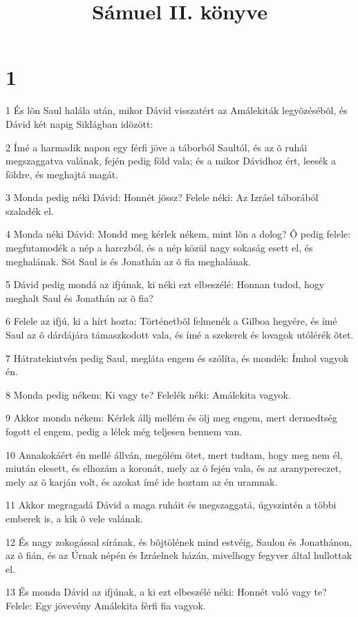 

\title{Sámuel II. könyve}


\chapter{1}

\par 1 És lõn Saul halála után, mikor Dávid visszatért az Amálekiták legyõzésébõl, és Dávid két napig Siklágban idõzött:
\par 2 Ímé a harmadik napon egy férfi jöve a táborból Saultól, és az õ ruhái megszaggatva valának, fején pedig föld vala; és a mikor Dávidhoz ért, leesék a földre, és meghajtá magát.
\par 3 Monda pedig néki Dávid: Honnét jössz? Felele néki: Az Izráel táborából szaladék el.
\par 4 Monda néki Dávid: Mondd meg kérlek nékem, mint lõn a dolog? Õ pedig felele: megfutamodék a nép a harczból, és a nép közül nagy sokaság esett el, és meghalának. Sõt Saul is és Jonathán az õ fia meghalának.
\par 5 Dávid pedig mondá az ifjúnak, ki néki ezt elbeszélé: Honnan tudod, hogy meghalt Saul és Jonathán az õ fia?
\par 6 Felele az ifjú, ki a hírt hozta: Történetbõl felmenék a Gilboa hegyére, és ímé Saul az õ dárdájára támaszkodott vala, és ímé a szekerek és lovagok utólérék õtet.
\par 7 Hátratekintvén pedig Saul, megláta engem és szólíta, és mondék: Ímhol vagyok én.
\par 8 Monda pedig nékem: Ki vagy te? Felelék néki: Amálekita vagyok.
\par 9 Akkor monda nékem: Kérlek állj mellém és ölj meg engem, mert dermedtség fogott el engem, pedig a lélek még teljesen bennem van.
\par 10 Annakokáért én mellé állván, megölém õtet, mert tudtam, hogy meg nem él, miután elesett, és elhozám a koronát, mely az õ fején vala, és az aranypereczet, mely az õ karján volt, és azokat ímé ide hoztam az én uramnak.
\par 11 Akkor megragadá Dávid a maga ruháit és megszaggatá, úgyszintén a többi emberek is, a kik õ vele valának.
\par 12 És nagy zokogással sírának, és bõjtölének mind estvéig, Saulon és Jonathánon, az õ fián, és az Úrnak népén és Izráelnek házán, mivelhogy fegyver által hullottak el.
\par 13 És monda Dávid az ifjúnak, a ki ezt elbeszélé néki: Honnét való vagy te? Felele: Egy jövevény Amálekita férfi fia vagyok.

